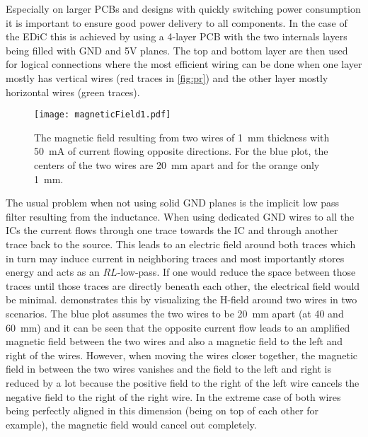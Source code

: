 Especially on larger \glspl{PCB} and designs with quickly switching power consumption it is important to ensure good power delivery to all components.
In the case of the \gls{EDiC} this is achieved by using a 4-layer \gls{PCB} with the two internals layers being filled with GND and 5V planes.
The top and bottom layer are then used for logical connections where the most efficient wiring can be done when one layer mostly has vertical wires (red traces in \cref{fig:pr}) and the other layer mostly horizontal wires (green traces).

\begin{figure}[t]
  \centering
  \texttt{[image: magneticField1.pdf]}
  \caption{The magnetic field resulting from two wires of \qty{1}{\milli\meter} thickness with \qty{50}{\milli\ampere} of current flowing opposite directions.
  For the blue plot, the centers of the two wires are \qty{20}{\milli\meter} apart and for the orange only \qty{1}{\milli\meter}. \cite[page 187]{Albach2011_1}}
  \label{fig:HField}
\end{figure}
The usual problem when not using solid GND planes is the implicit low pass filter resulting from the inductance.
When using dedicated GND wires to all the \glspl{IC} the current flows through one trace towards the \gls{IC} and through another trace back to the source.
This leads to an electric field around both traces which in turn may induce current in neighboring traces and most importantly stores energy and acts as an $RL$-low-pass.
If one would reduce the space between those traces until those traces are directly beneath each other, the electrical field would be minimal.
 demonstrates this by visualizing the H-field around two wires in two scenarios.
The blue plot assumes the two wires to be \qty{20}{\milli\meter} apart (at 40 and \qty{60}{\milli\meter}) and it can be seen that the opposite current flow leads to an amplified magnetic field between the two wires and also a magnetic field to the left and right of the wires.
However, when moving the wires closer together, the magnetic field in between the two wires vanishes and the field to the left and right is reduced by a lot because the positive field to the right of the left wire cancels the negative field to the right of the right wire.
In the extreme case of both wires being perfectly aligned in this dimension (being on top of each other for example), the magnetic field would cancel out completely.


